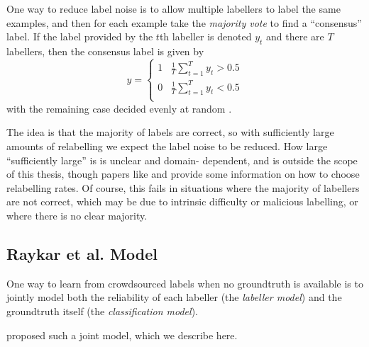         One way to reduce label noise is to allow multiple labellers to label
        the same examples, and then for each example take the \emph{majority
        vote} to find a ``consensus'' label. If the label provided by the $t$th
        labeller is denoted $y_t$ and there are $T$ labellers, then the
        consensus label is given by
        \begin{equation*}
            y = \begin{cases}
                1 & \frac{1}{T} \sum_{t = 1}^T y_t > 0.5\\
                0 & \frac{1}{T} \sum_{t = 1}^T y_t < 0.5\\
            \end{cases}
        \end{equation*}
        with the remaining case decided evenly at random \citep{raykar10}.

        The idea is that the majority of labels are correct, so with
        sufficiently large amounts of relabelling we expect the label noise to
        be reduced. How large ``sufficiently large'' is is unclear and domain-
        dependent, and is outside the scope of this thesis, though papers like
        \citet{sheng08} and \citet{lin16} provide some information on how to
        choose relabelling rates. Of course, this fails in situations where the
        majority of labellers are not correct, which may be due to intrinsic
        difficulty or malicious labelling, or where there is no clear majority.


    \subsection{Raykar et al. Model}
    \label{sec:raykar}

        One way to learn from crowdsourced labels when no groundtruth is
        available is to jointly model both the reliability of each labeller (the
        \emph{labeller model}) and the groundtruth itself (the
        \emph{classification model}).

        \citet{raykar10} proposed such a joint model, which we describe here.

